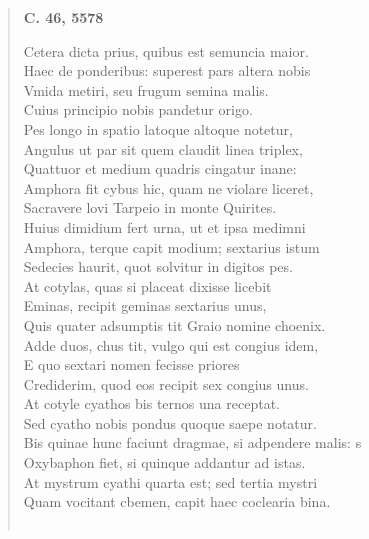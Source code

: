 \documentclass[11pt, a4paper]{report}
\begin{document}
\begin{verse}
     \marginpar{[20]} \begin{center} \textbf{C. 46, 5578} \end{center}Cetera dicta prius, quibus est semuncia maior. \\ Haec de ponderibus: superest pars altera nobis \\ Vmida metiri, seu frugum semina malis. \\ Cuius principio nobis pandetur origo. \\ Pes longo in spatio latoque altoque notetur, \\ Angulus ut par sit quem claudit linea triplex, \\ Quattuor et medium quadris cingatur inane: \\ Amphora fit cybus hic, quam ne violare liceret, \\ Sacravere lovi Tarpeio in monte Quirites. \\ Huius dimidium fert urna, ut  \lbrack et \rbrack  ipsa medimni \\ Amphora, terque capit modium; sextarius istum \\ Sedecies haurit, quot solvitur in digitos pes. \\ At cotylas, quas si placeat dixisse licebit \\ Eminas, recipit geminas sextarius unus, \\ Quis quater adsumptis tit Graio nomine choenix. \\ Adde duos, chus tit, vulgo qui est congius idem, \\ E quo sextari nomen fecisse priores \\ Crediderim, quod eos recipit sex congius unus. \\ At cotyle cyathos bis ternos una receptat. \\ Sed cyatho nobis pondus quoque saepe notatur. \\ Bis quinae hunc faciunt dragmae, si adpendere malis: s \\ Oxybaphon fiet, si quinque addantur ad istas. \\ At mystrum cyathi quarta est; sed tertia mystri \\ Quam vocitant cbemen, capit haec coclearia bina. \\ 
        ﻿\pagebreak 

\end{verse}
\end{document}
